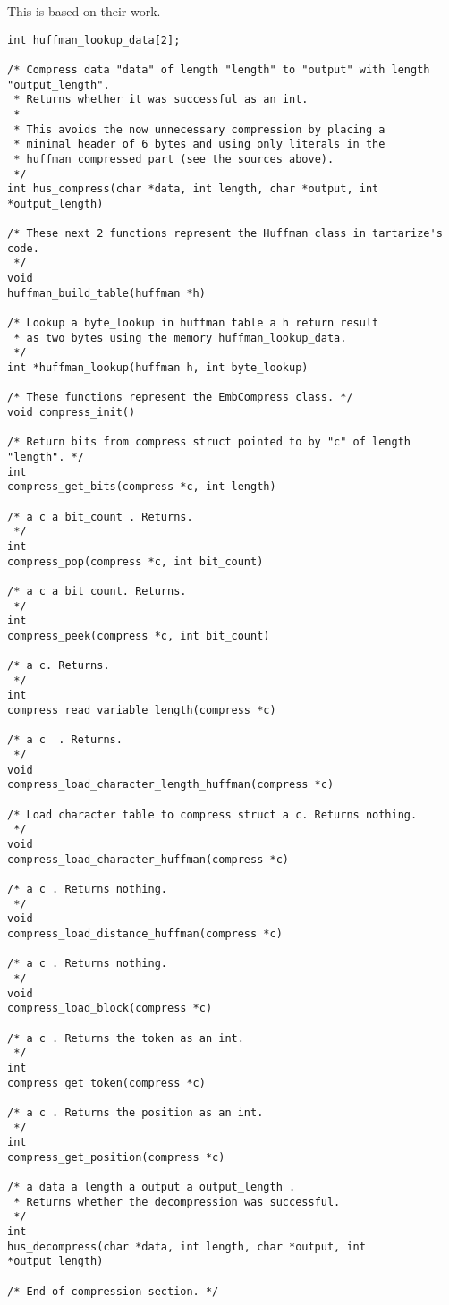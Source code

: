 This is based on their work.

\begin{lstlisting}
int huffman_lookup_data[2];

/* Compress data "data" of length "length" to "output" with length "output_length".
 * Returns whether it was successful as an int.
 *
 * This avoids the now unnecessary compression by placing a
 * minimal header of 6 bytes and using only literals in the
 * huffman compressed part (see the sources above).
 */
int hus_compress(char *data, int length, char *output, int *output_length)

/* These next 2 functions represent the Huffman class in tartarize's code.
 */
void
huffman_build_table(huffman *h)

/* Lookup a byte_lookup in huffman table a h return result
 * as two bytes using the memory huffman_lookup_data.
 */
int *huffman_lookup(huffman h, int byte_lookup)

/* These functions represent the EmbCompress class. */
void compress_init()

/* Return bits from compress struct pointed to by "c" of length "length". */
int
compress_get_bits(compress *c, int length)

/* a c a bit_count . Returns.
 */
int
compress_pop(compress *c, int bit_count)

/* a c a bit_count. Returns.
 */
int
compress_peek(compress *c, int bit_count)

/* a c. Returns.
 */
int
compress_read_variable_length(compress *c)

/* a c  . Returns.
 */
void
compress_load_character_length_huffman(compress *c)

/* Load character table to compress struct a c. Returns nothing.
 */
void
compress_load_character_huffman(compress *c)

/* a c . Returns nothing.
 */
void
compress_load_distance_huffman(compress *c)

/* a c . Returns nothing.
 */
void
compress_load_block(compress *c)

/* a c . Returns the token as an int.
 */
int
compress_get_token(compress *c)

/* a c . Returns the position as an int.
 */
int
compress_get_position(compress *c)

/* a data a length a output a output_length .
 * Returns whether the decompression was successful.
 */
int
hus_decompress(char *data, int length, char *output, int *output_length)

/* End of compression section. */


\end{lstlisting}
